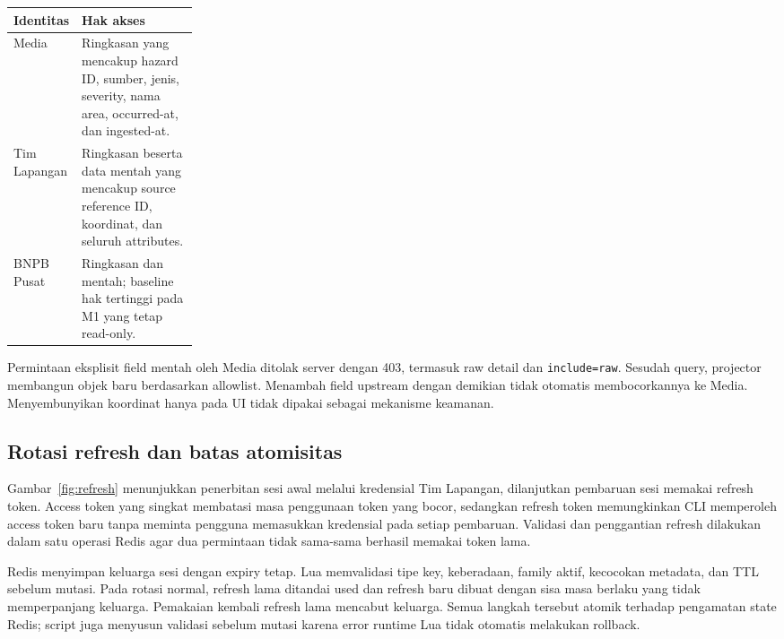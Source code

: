 \begin{tabularx}{\linewidth}{P{0.24\linewidth}Y}
\toprule Identitas & Hak akses\\\midrule
Media & Ringkasan yang mencakup hazard ID, sumber, jenis, severity, nama area, occurred-at, dan ingested-at.\\
Tim Lapangan & Ringkasan beserta data mentah yang mencakup source reference ID, koordinat, dan seluruh attributes.\\
BNPB Pusat & Ringkasan dan mentah; baseline hak tertinggi pada M1 yang tetap read-only.\\
\bottomrule
\end{tabularx}

Permintaan eksplisit field mentah oleh Media ditolak server dengan 403, termasuk raw detail dan \texttt{include=raw}. Sesudah query, projector membangun objek baru berdasarkan allowlist. Menambah field upstream dengan demikian tidak otomatis membocorkannya ke Media. Menyembunyikan koordinat hanya pada UI tidak dipakai sebagai mekanisme keamanan.


\subsection{Rotasi refresh dan batas atomisitas}

Gambar~\ref{fig:refresh} menunjukkan penerbitan sesi awal melalui kredensial Tim Lapangan, dilanjutkan pembaruan sesi memakai refresh token. Access token yang singkat membatasi masa penggunaan token yang bocor, sedangkan refresh token memungkinkan CLI memperoleh access token baru tanpa meminta pengguna memasukkan kredensial pada setiap pembaruan. Validasi dan penggantian refresh dilakukan dalam satu operasi Redis agar dua permintaan tidak sama-sama berhasil memakai token lama.

Redis menyimpan keluarga sesi dengan expiry tetap. Lua memvalidasi tipe key, keberadaan, family aktif, kecocokan metadata, dan TTL sebelum mutasi. Pada rotasi normal, refresh lama ditandai used dan refresh baru dibuat dengan sisa masa berlaku yang tidak memperpanjang keluarga. Pemakaian kembali refresh lama mencabut keluarga. Semua langkah tersebut atomik terhadap pengamatan state Redis; script juga menyusun validasi sebelum mutasi karena error runtime Lua tidak otomatis melakukan rollback.

